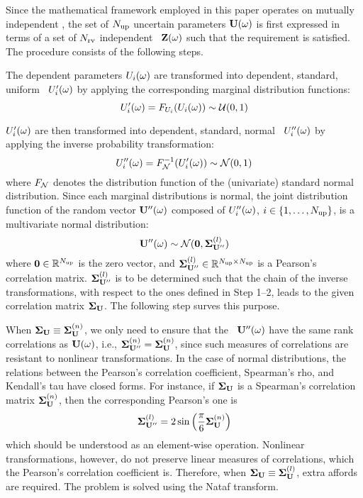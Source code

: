 Since the mathematical framework employed in this paper operates on mutually independent \rvs, the set of ${N_\text{up}}$ uncertain parameters $\mathbf{U}(\omega)$ is first expressed in terms of a set of ${N_\text{rv}}$ independent \rvs\ $\mathbf{Z}(\omega)$ such that the requirement is satisfied. The procedure consists of the following steps.

 The dependent parameters $U_i(\omega)$ are transformed into dependent, standard, uniform \rvs\ $U'_i(\omega)$ by applying the corresponding marginal distribution functions:
\begin{equation} \elabel{dependent-uniform}
  \U'_i(\o) = \CDF_{\U_i}(\U_i(\o)) \sim \uniform(0, 1)
\end{equation}

 $U'_i(\omega)$ are then transformed into dependent, standard, normal \rvs\ $U''_i(\omega)$ by applying the inverse probability transformation:
\begin{equation} \elabel{dependent-normal}
  \U''_i(\o) = \CDF^{-1}_\normal(\U'_i(\o)) \sim \normal(0, 1)
\end{equation}
where $F_{\mathcal{N}}$ denotes the distribution function of the (univariate) standard normal distribution. Since each marginal distributions is normal, the joint distribution function of the random vector $\mathbf{U}''(\omega)$ composed of $U''_i(\omega)$, $i \in \{ 1, \dots, {N_\text{up}} \}$, is a multivariate normal distribution:
\[
  \mathbf{U}''(\omega) \sim \mathcal{N}(\mathbf{0}, \mathbf{\Sigma}^{(l)}_{\mathbf{U}''})
\]
where $\mathbf{0} \in \mathbb{R}^{N_\text{up}}$ is the zero vector, and $\mathbf{\Sigma}^{(l)}_{\mathbf{U}''} \in \mathbb{R}^{{N_\text{up}} \times {N_\text{up}}}$ is a Pearson's correlation matrix. $\mathbf{\Sigma}^{(l)}_{\mathbf{U}''}$ is to be determined such that the chain of the inverse transformations, with respect to the ones defined in Step 1--2, leads to the given correlation matrix $\mathbf{\Sigma}_{\mathbf{U}}$. The following step surves this purpose.

 When $\mathbf{\Sigma}_{\mathbf{U}} \equiv \mathbf{\Sigma}^{(n)}_{\mathbf{U}}$, we only need to ensure that the \rvs\ $\mathbf{U}''(\omega)$ have the same rank correlations as $\mathbf{U}(\omega)$, i.e., $\mathbf{\Sigma}^{(n)}_{\mathbf{U}''} = \mathbf{\Sigma}^{(n)}_{\mathbf{U}}$, since such measures of correlations are resistant to nonlinear transformations. In the case of normal distributions, the relations between the Pearson's correlation coefficient, Spearman's rho, and Kendall's tau have closed forms. For instance, if $\mathbf{\Sigma}_{\mathbf{U}}$ is a Spearman's correlation matrix $\mathbf{\Sigma}^{(n)}_{\mathbf{U}}$, then the corresponding Pearson's one is
\[
  \mathbf{\Sigma}^{(l)}_{\mathbf{U}''} = 2 \sin \left( \frac{\pi}{6} \mathbf{\Sigma}^{(n)}_{\mathbf{U}} \right)
\]
which should be understood as an element-wise operation. Nonlinear transformations, however, do not preserve linear measures of correlations, which the Pearson's correlation coefficient is. Therefore, when $\mathbf{\Sigma}_{\mathbf{U}} \equiv \mathbf{\Sigma}^{(l)}_{\mathbf{U}}$, extra affords are required. The problem is solved using the Nataf transform.

